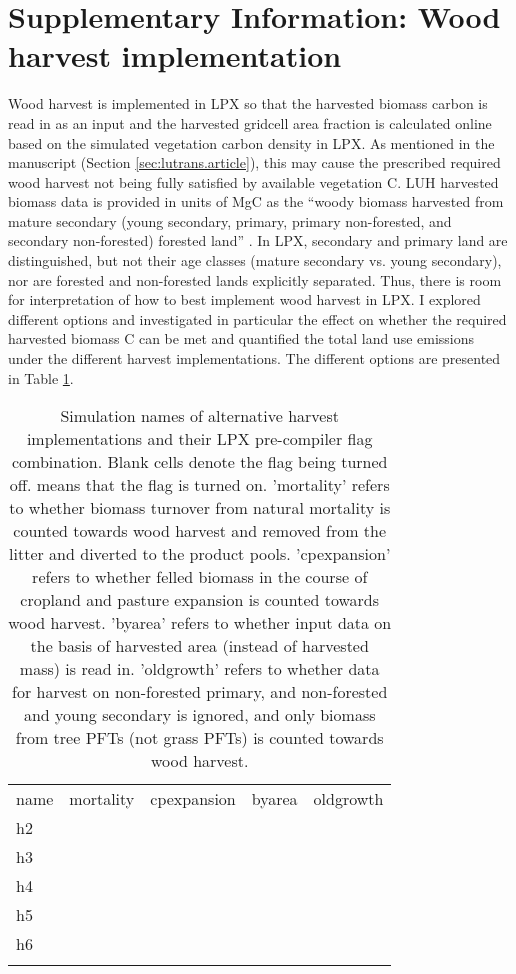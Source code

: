 \section{Supplementary Information: Wood harvest implementation}
\label{sec:harvest}
Wood harvest is implemented in LPX so that the harvested biomass carbon is read in as an input and the harvested gridcell area fraction is calculated online based on the simulated vegetation carbon density in LPX. As mentioned in the manuscript (Section \ref{sec:lutrans.article}), this may cause the prescribed required wood harvest not being fully satisfied by available vegetation C. LUH harvested biomass data is provided in units of MgC as the ``woody biomass harvested from mature secondary (young secondary, primary, primary non-forested, and secondary non-forested) forested land'' \citep{luh}. In LPX, secondary and primary land are distinguished, but not their age classes (mature secondary vs. young secondary), nor are forested and non-forested lands explicitly separated. Thus, there is room for interpretation of how to best implement wood harvest in LPX. I explored different options and investigated in particular the effect on whether the required harvested biomass C can be met and quantified the total land use emissions under the different harvest implementations. The different options are presented in Table \ref{tab:harvest}.\\

\begin{table}
\centering
\small\sffamily
\begin{tabular}{l|cccc}
\tophline
name		&mortality	&cpexpansion		&byarea		&oldgrowth	\\
\middlehline
h2		&			&				&			&			\\
h3		&\cmark			&				&			&			\\
h4		&			&				&			&\cmark			\\
h5		&			&				&\cmark			&			\\
h6		&			&\cmark				&			&			\\
\bottomhline
\end{tabular}
\vskip4mm
\caption[Simulation names of alternative harvest implementations]{Simulation names of alternative harvest implementations and their LPX pre-compiler flag combination. Blank cells denote the flag being turned off. \cmark means that the flag is turned on. 'mortality' refers to whether biomass turnover from natural mortality is counted towards wood harvest and removed from the litter and diverted to the product pools. 'cpexpansion' refers to whether felled biomass in the course of cropland and pasture expansion is counted towards wood harvest. 'byarea' refers to whether input data on the basis of harvested area (instead of harvested mass) is read in. 'oldgrowth' refers to whether data for harvest on non-forested primary, and non-forested and young secondary is ignored, and only biomass from tree PFTs (not grass PFTs) is counted towards wood harvest.}
\label{tab:harvest}
\end{table}

